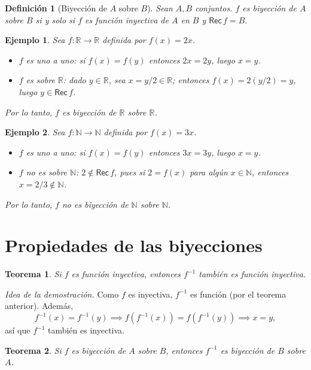 \documentclass[11pt]{article}
\newtheorem*{definicion}{Definición}
\newtheorem*{ejemplo}{Ejemplo}
\newtheorem*{teorema}{Teorema}
\begin{document}
\begin{definicion}[Biyección de $A$ sobre $B$]
Sean $A,B$ conjuntos. $f$ es biyección de $A$ sobre $B$ si y solo si $f$ es
función inyectiva de $A$ en $B$ y $\mathsf{Rec}\,f = B$.
\end{definicion}

\begin{ejemplo}
Sea $f:\mathbb{R}\to\mathbb{R}$ definida por $f(x) = 2x$.
\begin{itemize}
\item $f$ es uno a uno: si $f(x)=f(y)$ entonces $2x=2y$, luego $x=y$.
\item $f$ es sobre $\mathbb{R}$: dado $y \in \mathbb{R}$, sea $x = y/2 \in \mathbb{R}$;
entonces $f(x) = 2(y/2) = y$, luego $y \in \mathsf{Rec}\,f$.
\end{itemize}
Por lo tanto, $f$ es biyección de $\mathbb{R}$ sobre $\mathbb{R}$.
\end{ejemplo}

\begin{ejemplo}
Sea $f:\mathbb{N}\to\mathbb{N}$ definida por $f(x) = 3x$.
\begin{itemize}
\item $f$ es uno a uno: si $f(x)=f(y)$ entonces $3x=3y$, luego $x=y$.
\item $f$ no es sobre $\mathbb{N}$: $2 \notin \mathsf{Rec}\,f$, pues si $2=f(x)$ para algún
$x\in\mathbb{N}$, entonces $x = 2/3 \notin \mathbb{N}$.
\end{itemize}
Por lo tanto, $f$ no es biyección de $\mathbb{N}$ sobre $\mathbb{N}$.
\end{ejemplo}

\section{Propiedades de las biyecciones}

\begin{teorema}
Si $f$ es función inyectiva, entonces $f^{-1}$ también es función inyectiva.
\end{teorema}

\emph{Idea de la demostración.} Como $f$ es inyectiva, $f^{-1}$ es función
(por el teorema anterior). Además,
\[
f^{-1}(x) = f^{-1}(y) \implies f(f^{-1}(x)) = f(f^{-1}(y)) \implies x=y,
\]
así que $f^{-1}$ también es inyectiva.

\begin{teorema}
Si $f$ es biyección de $A$ sobre $B$, entonces $f^{-1}$ es biyección de $B$
sobre $A$.
\end{teorema}
\end{document}
